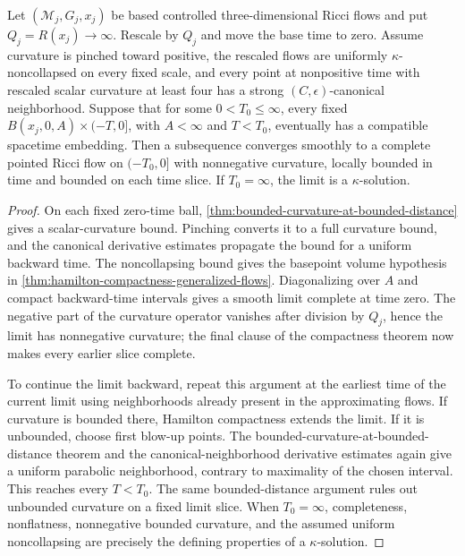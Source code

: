 \begin{theorem}
\label{thm:pointed-controlled-flow-compactness}
\notready
Let $(\mathcal M_j,G_j,x_j)$ be based controlled three-dimensional Ricci
flows and put $Q_j=R(x_j)\to\infty$.  Rescale by $Q_j$ and move the base
time to zero.  Assume curvature is pinched toward positive, the rescaled
flows are uniformly $\kappa$-noncollapsed on every fixed scale, and every
point at nonpositive time with rescaled scalar curvature at least four has a
strong $(C,\epsilon)$-canonical neighborhood.  Suppose that for some
$0<T_0\le\infty$, every fixed
$B(x_j,0,A)\times(-T,0]$, with $A<\infty$ and $T<T_0$, eventually has a
compatible spacetime embedding.  Then a subsequence converges smoothly to a
complete pointed Ricci flow on $(-T_0,0]$ with nonnegative curvature,
locally bounded in time and bounded on each time slice.  If $T_0=\infty$,
the limit is a $\kappa$-solution.
\end{theorem}

\begin{proof}
On each fixed zero-time ball,
\ref{thm:bounded-curvature-at-bounded-distance} gives a scalar-curvature
bound.  Pinching converts it to a full curvature bound, and the canonical
derivative estimates propagate the bound for a uniform backward time.
The noncollapsing bound gives the basepoint volume hypothesis in
\ref{thm:hamilton-compactness-generalized-flows}.  Diagonalizing over $A$
and compact backward-time intervals gives a smooth limit complete at time
zero.
The negative part of the curvature operator vanishes after division by
$Q_j$, hence the limit has nonnegative curvature; the final clause of the
compactness theorem now makes every earlier slice complete.

To continue the limit backward, repeat this argument at the earliest time of
the current limit using neighborhoods already present in the approximating
flows.  If curvature is bounded there, Hamilton compactness extends the
limit.  If it is unbounded, choose first blow-up points.  The
bounded-curvature-at-bounded-distance theorem and the canonical-neighborhood
derivative estimates again give a uniform parabolic neighborhood, contrary
to maximality of the chosen interval.  This reaches every $T<T_0$.
The same bounded-distance argument rules out unbounded curvature on a fixed
limit slice.  When $T_0=\infty$, completeness, nonflatness,
nonnegative bounded curvature, and the assumed uniform noncollapsing are
precisely the defining properties of a $\kappa$-solution.
\end{proof}

